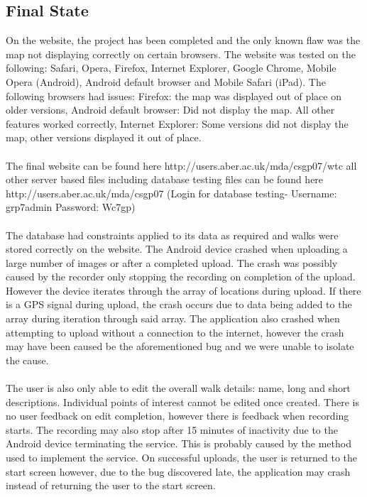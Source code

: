 \documentclass[12pt]{article}
\begin{document}
\subsection{Final State}
On the website, the project has been completed and the only known flaw was the map not displaying correctly on certain browsers. The website was tested on the following: Safari, Opera, Firefox, Internet Explorer, Google Chrome, Mobile Opera (Android), Android default browser and Mobile Safari (iPad). The following browsers had issues:\- Firefox: the map was displayed out of place on older versions, Android default browser: Did not display the map. All other features worked correctly, Internet Explorer: Some versions did not display the map, other versions displayed it out of place.
\\\\
The final website can be found here http://users.aber.ac.uk/mda/csgp07/wtc all other server based files including database testing files can be found here http://users.aber.ac.uk/mda/csgp07 (Login for database testing- Username: grp7admin Password: Wc7gp)
\\\\
The database had constraints applied to its data as required and walks were stored correctly on the website. The Android device crashed when uploading a large number of images or after a completed upload. The crash was possibly caused by the recorder only stopping the recording on completion of the upload. However the device iterates through the array of locations during upload. If there is a GPS signal during upload, the crash occurs due to data being added to the array during iteration through said array. The application also crashed when attempting to upload without a connection to the internet, however the crash may have been caused be the aforementioned bug and we were unable to isolate the cause.
\\\\
The user is also only able to edit the overall walk details: name, long and short descriptions. Individual points of interest cannot be edited once created. There is no user feedback on edit completion, however there is feedback when recording starts. The recording may also stop after 15 minutes of inactivity due to the Android device terminating the service. This is probably caused by the method used to implement the service. On successful uploads, the user is returned to the start screen however, due to the bug discovered late, the application may crash instead of returning the user to the start screen. 
\end{document}
